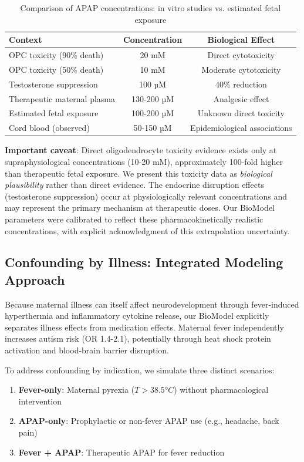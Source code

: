 \documentclass[11pt]{article}
\let\oldsubsection\subsection
\renewcommand{\subsection}[1]{\oldsubsection{#1}\setlength{\leftskip}{0.75em}}
\begin{document}
\begin{table}[h]
\centering
\caption{Comparison of APAP concentrations: in vitro studies vs. estimated fetal exposure}
\label{tab:dose-comparison}
\begin{tabular}{lcc}
\hline
\textbf{Context} & \textbf{Concentration} & \textbf{Biological Effect} \\
\hline
OPC toxicity (90\% death) \citep{perez2012} & 20 mM & Direct cytotoxicity \\
OPC toxicity (50\% death) & 10 mM & Moderate cytotoxicity \\
Testosterone suppression \citep{kristensen2016} & 100 µM & 40\% reduction \\
Therapeutic maternal plasma & 130-200 µM & Analgesic effect \\
Estimated fetal exposure & 100-200 µM & Unknown direct toxicity \\
Cord blood (observed) & 50-150 µM & Epidemiological associations \\
\hline
\end{tabular}
\end{table}

\textbf{Important caveat}: Direct oligodendrocyte toxicity evidence exists only at supraphysiological concentrations (10-20 mM), approximately 100-fold higher than therapeutic fetal exposure. We present this toxicity data as \textit{biological plausibility} rather than direct evidence. The endocrine disruption effects (testosterone suppression) occur at physiologically relevant concentrations and may represent the primary mechanism at therapeutic doses. Our BioModel parameters were calibrated to reflect these pharmacokinetically realistic concentrations, with explicit acknowledgment of this extrapolation uncertainty.

\subsection{Confounding by Illness: Integrated Modeling Approach}
Because maternal illness can itself affect neurodevelopment through fever-induced hyperthermia and inflammatory cytokine release, our BioModel explicitly separates illness effects from medication effects. Maternal fever independently increases autism risk (OR 1.4-2.1), potentially through heat shock protein activation and blood-brain barrier disruption.

To address confounding by indication, we simulate three distinct scenarios:
\begin{enumerate}
\item \textbf{Fever-only}: Maternal pyrexia ($T > 38.5°C$) without pharmacological intervention
\item \textbf{APAP-only}: Prophylactic or non-fever APAP use (e.g., headache, back pain)  
\item \textbf{Fever + APAP}: Therapeutic APAP for fever reduction
\end{enumerate}
\end{document}
